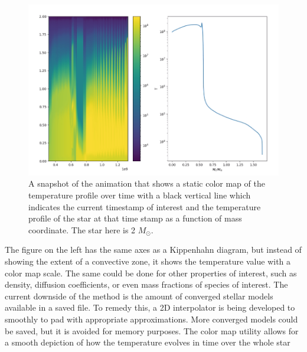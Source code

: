 \documentclass{article}
\begin{document}
\begin{figure}[H]
    \centerline{\includegraphics[scale = 0.5]{images/movie_slice.png}}
    \caption{A snapshot of the animation that shows a static color map of the temperature profile over time with a black vertical 
    line which indicates the current timestamp of interest and the temperature profile of the star at that time stamp as a function 
    of mass coordinate. The star here is 2 $M_{\odot}$.}
    \label{movie_cut}
\end{figure}

The figure on the left has the same axes as a Kippenhahn diagram, but instead of showing the extent of a convective zone, it shows 
the temperature value with a color map scale. The same could be done for other properties of interest, such as density, diffusion 
coefficients, or even mass fractions of species of interest. The current downside of the method is the amount of converged stellar 
models available in a saved file. To remedy this, a 2D interpolator is being developed to smoothly to pad with appropriate 
approximations. More converged models could be saved, but it is avoided for memory purposes. The color map utility allows for a 
smooth depiction of how the temperature evolves in time over the whole star  

\singlespacing



\end{document}
